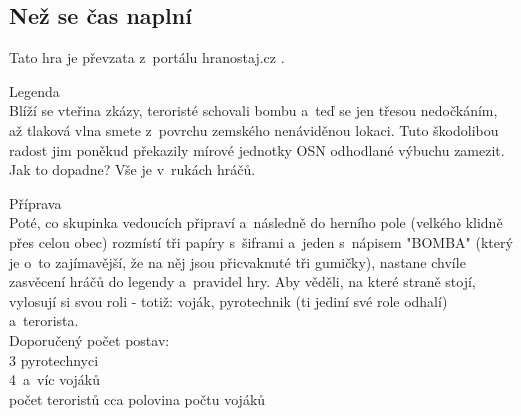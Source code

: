
\subsection{Než se čas naplní}
Tato hra je převzata z~portálu hranostaj.cz \cite{NezSeCasNaplni}.

Legenda\\
Blíží se vteřina zkázy, teroristé schovali bombu a~teď se jen třesou nedočkáním, až tlaková vlna smete z~povrchu zemského nenáviděnou lokaci. 
Tuto škodolibou radost jim poněkud překazily mírové jednotky OSN odhodlané výbuchu zamezit. 
Jak to dopadne? 
Vše je v~rukách hráčů.

Příprava\\
Poté, co skupinka vedoucích připraví a~následně do herního pole (velkého klidně přes celou obec) rozmístí tři papíry s~šiframi a~jeden s~nápisem "BOMBA" (který je o~to zajímavější, že na něj jsou přicvaknuté tři gumičky), nastane chvíle zasvěcení hráčů do legendy a~pravidel hry. 
Aby věděli, na které straně stojí, vylosují si svou roli - totiž: voják, pyrotechnik (ti jediní své role odhalí) a~terorista.\\
Doporučený počet postav:\\
3 pyrotechnyci\\
4~a~víc vojáků\\
počet teroristů cca polovina počtu vojáků \\

